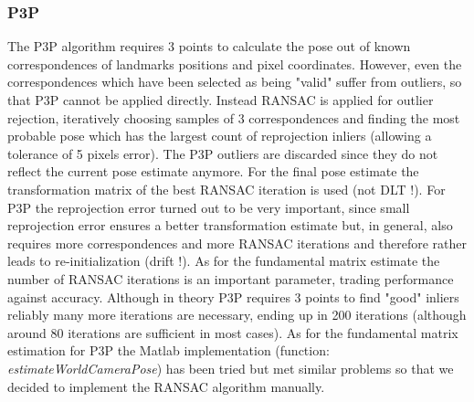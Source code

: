 \documentclass[letterpaper, 12 pt]{article}
\begin{document}
\begin{multicols*}{2}
\subsubsection{P3P}
The P3P algorithm requires 3 points to calculate the pose out of known correspondences of landmarks positions and pixel coordinates. However, even the correspondences which have been selected as being "valid" suffer from outliers, so that P3P cannot be applied directly. Instead RANSAC is applied for outlier rejection, iteratively choosing samples of 3 correspondences and finding the most probable pose which has the largest count of reprojection inliers (allowing a tolerance of 5 pixels error). The P3P outliers are discarded since they do not reflect the current pose estimate anymore. For the final pose estimate the transformation matrix of the best RANSAC iteration is used (not DLT !). 
\newline
For P3P the reprojection error turned out to be very important, since small reprojection error ensures a better transformation estimate but, in general, also requires more correspondences and more RANSAC iterations and therefore rather leads to re-initialization (drift !). 
\newline 
As for the fundamental matrix estimate the number of RANSAC iterations is an important parameter, trading performance against accuracy. Although in theory P3P requires 3 points to find "good" inliers reliably many more iterations are necessary, ending up in 200 iterations (although around 80 iterations are sufficient in most cases). 
\newline
As for the fundamental matrix estimation for P3P the Matlab implementation (function: \textit{estimateWorldCameraPose}) has been tried but met similar problems so that we decided to implement the RANSAC algorithm manually. 


\end{multicols*}
\end{document}
